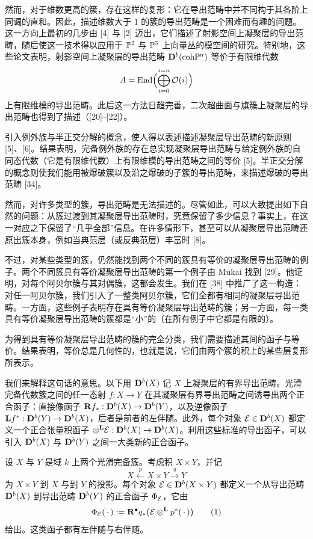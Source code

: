 然而，对于维数更高的簇，存在这样的复形：它在导出范畴中并不同构于其各阶上同调的直和。因此，描述维数大于 $1$ 的簇的导出范畴是一个困难而有趣的问题。这一方向上最初的几步由 [4] 与 [2] 迈出，它们描述了射影空间上凝聚层的导出范畴，随后使这一技术得以应用于 $\mathbb{P}^2$ 与 $\mathbb{P}^3$ 上向量丛的模空间的研究。特别地，这些论文表明，射影空间上凝聚层的导出范畴 $\mathbf{D}^{b}(\mathrm{coh}\mathbb{P}^n)$ 等价于有限维代数
\begin{equation*}
A=\operatorname{End}\Bigl(\bigoplus_{i=0}^{i=n}\mathcal{O}(i)\Bigr)
\end{equation*}
上有限维模的导出范畴。此后这一方法日趋完善，二次超曲面与旗簇上凝聚层的导出范畴也得到了描述（[20]--[22]）。

引入例外族与半正交分解的概念，使人得以表述描述凝聚层导出范畴的新原则 [5]、[6]。结果表明，完备例外族的存在总实现凝聚层导出范畴与给定例外族的自同态代数（它是有限维代数）上有限维模的导出范畴之间的等价 [5]。半正交分解的概念则使我们能用被爆破簇以及沿之爆破的子簇的导出范畴，来描述爆破的导出范畴 [34]。

然而，对许多类型的簇，导出范畴是无法描述的。尽管如此，可以大致提出如下自然的问题：从簇过渡到其凝聚层导出范畴时，究竟保留了多少信息？事实上，在这一对应之下保留了“几乎全部”信息。在许多情形下，甚至可以从凝聚层导出范畴还原出簇本身，例如当典范层（或反典范层）丰富时 [8]。

不过，对某些类型的簇，仍然能找到两个不同的簇具有等价的凝聚层导出范畴的例子。两个不同簇具有等价凝聚层导出范畴的第一个例子由 Mukai 找到 [29]。他证明，对每个阿贝尔簇与其对偶簇，这都会发生。我们在 [38] 中推广了这一构造：对任一阿贝尔簇，我们引入了一整类阿贝尔簇，它们全都有相同的凝聚层导出范畴。一方面，这些例子表明存在具有等价凝聚层导出范畴的簇；另一方面，每一类具有等价凝聚层导出范畴的簇都是“小”的（在所有例子中它都是有限的）。

为得到具有等价凝聚层导出范畴的簇的完全分类，我们需要描述其间的函子与等价。结果表明，等价总是几何性的，也就是说，它们由两个簇的积上的某些层复形所表示。

我们来解释这句话的意思。以下用 $\mathbf{D}^{b}(X)$ 记 $X$ 上凝聚层的有界导出范畴。光滑完备代数簇之间的任一态射 $f:X\to Y$ 在其凝聚层有界导出范畴之间诱导出两个正合函子：直接像函子 $\mathbf{R} f_*:\mathbf{D}^{b}(X)\to\mathbf{D}^{b}(Y)$，以及逆像函子 $\mathbf{L} f^*:\mathbf{D}^{b}(Y)\to\mathbf{D}^{b}(X)$，后者是前者的左伴随。此外，每个对象 $\mathcal{E}\in\mathbf{D}^{b}(X)$ 都定义一个正合张量积函子 $\otimes^{\mathbf{L}}\mathcal{E}:\mathbf{D}^{b}(X)\to\mathbf{D}^{b}(X)$。利用这些标准的导出函子，可以引入 $\mathbf{D}^{b}(X)$ 与 $\mathbf{D}^{b}(Y)$ 之间一大类新的正合函子。

设 $X$ 与 $Y$ 是域 $k$ 上两个光滑完备簇。考虑积 $X\times Y$，并记
\begin{equation*}
X\xleftarrow{\ p\ }X\times Y\xrightarrow{\ q\ }Y
\end{equation*}
为 $X\times Y$ 到 $X$ 与到 $Y$ 的投影。每个对象 $\mathcal{E}\in\mathbf{D}^{b}(X\times Y)$ 都定义一个从导出范畴 $\mathbf{D}^{b}(X)$ 到导出范畴 $\mathbf{D}^{b}(Y)$ 的正合函子 $\Phi_{\mathcal{E}}$，它由
\begin{equation}
\Phi_{\mathcal{E}}(\,\cdot\,):=\mathbf{R}^{\bullet} q_*\bigl(\mathcal{E}\otimes^{\mathbf{L}} p^*(\,\cdot\,)\bigr) \tag{1}
\end{equation}
给出。这类函子都有左伴随与右伴随。

